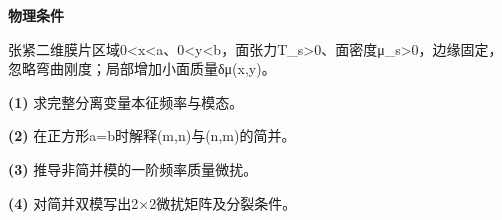\textbf{物理条件}\par 张紧二维膜片区域0<x<a、0<y<b，面张力T\_s>0、面密度μ\_s>0，边缘固定，忽略弯曲刚度；局部增加小面质量δμ(x,y)。
\par\noindent\textbf{(1)} 求完整分离变量本征频率与模态。
\par\noindent\textbf{(2)} 在正方形a=b时解释(m,n)与(n,m)的简并。
\par\noindent\textbf{(3)} 推导非简并模的一阶频率质量微扰。
\par\noindent\textbf{(4)} 对简并双模写出2×2微扰矩阵及分裂条件。
